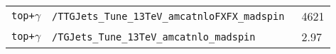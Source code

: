 \begin{table}[ht!]
\begin{center}
\begin{tabular}{|l l l|}
        \scriptsize{\texttt{top+$\gamma$}}      & \scriptsize{\texttt{/TTGJets\_Tune\_13TeV\_amcatnloFXFX\_madspin }}         &  \scriptsize{4621}       \\
        \scriptsize{\texttt{top+$\gamma$}}      & \scriptsize{\texttt{/TGJets\_Tune\_13TeV\_amcatnlo\_madspin }}              &  \scriptsize{2.97}       \\
\hline\hline
\end{tabular}
\end{center}
\end{table}                                                                                                                                                                                                                                                                                                                               
